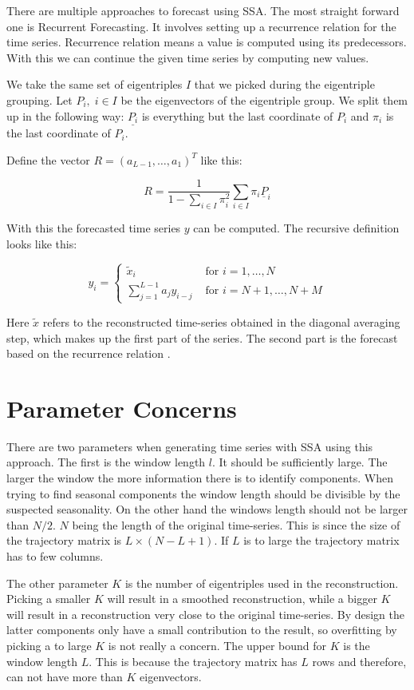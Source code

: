 There are multiple approaches to forecast using SSA. The most straight forward one is Recurrent Forecasting. It involves setting up a recurrence relation for the time series. Recurrence relation means a value is computed using its predecessors. With this we can continue the given time series by computing new values. 

We take the same set of eigentriples $I$ that we picked during the eigentriple grouping. Let $P_i, \; i \in I$ be the eigenvectors of the eigentriple group. We split them up in the following way: $\underline{P_i}$ is everything but the last coordinate of $P_i$ and $\pi_i$ is the last coordinate of $P_i$. 

Define the vector $R = (a_{L-1}, \dots, a_1)^T$ like this:

\begin{equation}
   R=\frac{1}{1-\sum_{i \in I} \pi_{i}^{2}} \sum_{i \in I} \pi_{i} \underline{P}_{i}
   \label{eq:r-def}
\end{equation}

With this the forecasted time series $y$ can be computed. The recursive definition looks like this:


\begin{equation}
  y_{i}=\left\{\begin{array}{ll}
\widetilde{x}_{i} & \text { for } i=1, \ldots, N \\
\sum_{j=1}^{L-1} a_{j} y_{i-j} & \text { for } i=N+1, \ldots, N+M
\end{array}\right. 
\end{equation}

\newpage

Here $\tilde{x}$ refers to the reconstructed time-series obtained in the diagonal averaging step, which makes up the first part of the series. The second part is the forecast based on the recurrence relation \parencite{golyandina2014basic}.

\section{Parameter Concerns}

There are two parameters when generating time series with SSA using this approach. The first is the window length $l$. It should be sufficiently large. The larger the window the more information there is to identify components. When trying to find seasonal components the window length should be divisible by the suspected seasonality. On the other hand the windows length should not be larger than $N/2$. $N$ being the length of the original time-series. This is since the size of the trajectory matrix is $L \times (N-L+1)$. If $L$ is to large the trajectory matrix has to few columns. 

The other parameter $K$ is the number of eigentriples used in the reconstruction. Picking a smaller $K$ will result in a smoothed reconstruction, while a bigger $K$ will result in a reconstruction very close to the original time-series. By design the latter components only have a small contribution to the result, so overfitting by picking a to large $K$ is not really a concern. The upper bound for $K$ is the window length $L$. This is because the trajectory matrix has $L$ rows and therefore, can not have more than $K$ eigenvectors. 